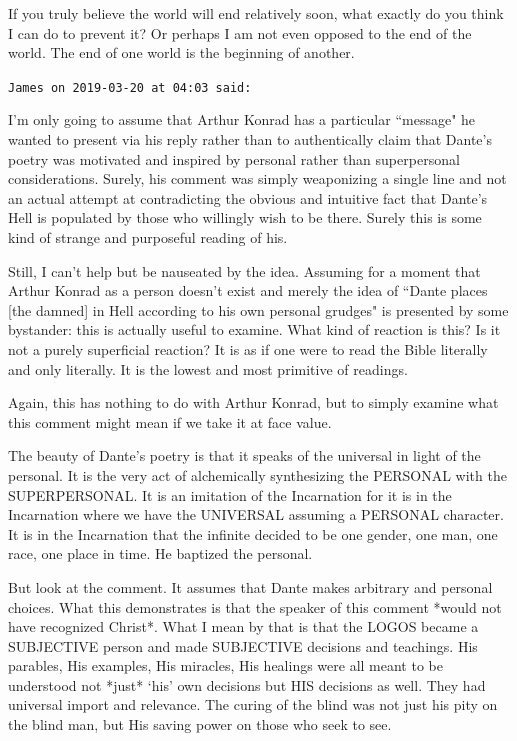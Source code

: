 \begin{footnotesize}
\begin{sffamily}
If you truly believe the world will end relatively soon, what exactly do you think I can do to prevent it? Or perhaps I am not even opposed to the end of the world. The end of one world is the beginning of another.


\hfill

\texttt{James on 2019-03-20 at 04:03 said: }

I'm only going to assume that Arthur Konrad has a particular ``message" he wanted to present via his reply rather than to authentically claim that Dante's poetry was motivated and inspired by personal rather than superpersonal considerations. Surely, his comment was simply weaponizing a single line and not an actual attempt at contradicting the obvious and intuitive fact that Dante's Hell is populated by those who willingly wish to be there. Surely this is some kind of strange and purposeful reading of his.

Still, I can't help but be nauseated by the idea. Assuming for a moment that Arthur Konrad as a person doesn't exist and merely the idea of ``Dante places [the damned] in Hell according to his own personal grudges" is presented by some bystander: this is actually useful to examine. What kind of reaction is this? Is it not a purely superficial reaction? It is as if one were to read the Bible literally and only literally. It is the lowest and most primitive of readings.

Again, this has nothing to do with Arthur Konrad, but to simply examine what this comment might mean if we take it at face value.

The beauty of Dante's poetry is that it speaks of the universal in light of the personal. It is the very act of alchemically synthesizing the PERSONAL with the SUPERPERSONAL. It is an imitation of the Incarnation for it is in the Incarnation where we have the UNIVERSAL assuming a PERSONAL character. It is in the Incarnation that the infinite decided to be one gender, one man, one race, one place in time. He baptized the personal.

But look at the comment. It assumes that Dante makes arbitrary and personal choices. What this demonstrates is that the speaker of this comment *would not have recognized Christ*. What I mean by that is that the LOGOS became a SUBJECTIVE person and made SUBJECTIVE decisions and teachings. His parables, His examples, His miracles, His healings were all meant to be understood not *just* `his' own decisions but HIS decisions as well. They had universal import and relevance. The curing of the blind was not just his pity on the blind man, but His saving power on those who seek to see.


\end{sffamily}
\end{footnotesize}
